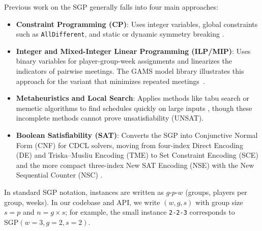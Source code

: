 \documentclass[a4paper,fleqn]{cas-sc}
\begin{document}
Previous work on the SGP generally falls into four main approaches:
\begin{itemize}[noitemsep]
    \item \textbf{Constraint Programming (CP)}: Uses integer variables, global constraints such as \texttt{AllDifferent}, and static or dynamic symmetry breaking \cite{harvey2005molr,azevedo2006dynamic,liu2019sgp,ortools}.
    \item \textbf{Integer and Mixed-Integer Linear Programming (ILP/MIP)}: Uses
    binary variables for player-group-week assignments and linearizes the
    indicators of pairwise meetings. The GAMS model library illustrates this
    approach for the variant that minimizes repeated meetings~\cite{gams-sgolfer}.
    \item \textbf{Metaheuristics and Local Search}: Applies methods like tabu search or memetic algorithms to find schedules quickly on large inputs \cite{cotta2006memetic,dotu2007local}, though these incomplete methods cannot prove unsatisfiability (UNSAT).
    \item \textbf{Boolean Satisfiability (SAT)}: Converts the SGP into Conjunctive Normal Form (CNF) for CDCL solvers, moving from four-index Direct Encoding (DE) \cite{gent2005sat} and Triska--Musliu Encoding (TME) \cite{triska2012tme} to Set Constraint Encoding (SCE) \cite{lardeux2015sce} and the more compact three-index New SAT Encoding (NSE) with the New Sequential Counter (NSC) \cite{kieu2025nse}.
\end{itemize}

In standard SGP notation, instances are written as $g\text{-}p\text{-}w$ (groups, players per group, weeks). In our codebase and API, we write $(w, g, s)$ with group size $s = p$ and $n = g \times s$; for example, the small instance \texttt{2-2-3} corresponds to $\text{SGP}(w=3, g=2, s=2)$.
\end{document}
